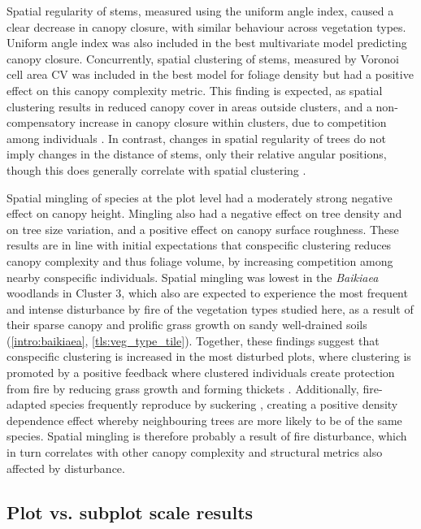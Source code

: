 \begin{refsection}
Spatial regularity of stems, measured using the uniform angle index, caused a clear decrease in canopy closure, with similar behaviour across vegetation types. Uniform angle index was also included in the best multivariate model predicting canopy closure. Concurrently, spatial clustering of stems, measured by Voronoi cell area CV was included in the best model for foliage density but had a positive effect on this canopy complexity metric. This finding is expected, as spatial clustering results in reduced canopy cover in areas outside clusters, and a non-compensatory increase in canopy closure within clusters, due to competition among individuals \citep{Martens2000}. In contrast, changes in spatial regularity of trees do not imply changes in the distance of stems, only their relative angular positions, though this does generally correlate with spatial clustering \citep{Gadow2002}.

Spatial mingling of species at the plot level had a moderately strong negative effect on canopy height. Mingling also had a negative effect on tree density and on tree size variation, and a positive effect on canopy surface roughness. These results are in line with initial expectations that conspecific clustering reduces canopy complexity and thus foliage volume, by increasing competition among nearby conspecific individuals. Spatial mingling was lowest in the \textit{Baikiaea} woodlands in Cluster 3, which also are expected to experience the most frequent and intense disturbance by fire of the vegetation types studied here, as a result of their sparse canopy and prolific grass growth on sandy well-drained soils (\autoref{intro:baikiaea}, \autoref{tls:veg_type_tile}). Together, these findings suggest that conspecific clustering is increased in the most disturbed plots, where clustering is promoted by a positive feedback where clustered individuals create protection from fire by reducing grass growth and forming thickets \citep{CharlesDominique2018}. Additionally, fire-adapted species frequently reproduce by suckering \citep{Hoffmann1998}, creating a positive density dependence effect whereby neighbouring trees are more likely to be of the same species. Spatial mingling is therefore probably a result of fire disturbance, which in turn correlates with other canopy complexity and structural metrics also affected by disturbance.

\subsection{Plot vs. subplot scale results}
\label{tls:ssec:plot_subplot}


\end{refsection}
